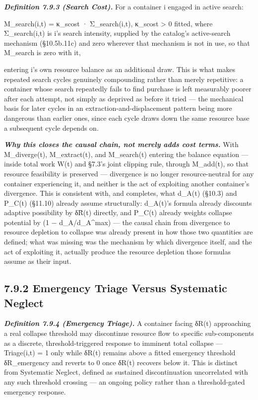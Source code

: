 \documentclass[
]{article}
\begin{document}
\emph{\textbf{Definition 7.9.3 (Search Cost).}} For a container i
engaged in active search:

M\_search(i,t) = κ\_scost · Σ\_search(i,t), κ\_scost \textgreater{} 0
fitted, where Σ\_search(i,t) is i's search intensity, supplied by the
catalog's active-search mechanism (§10.5b.11c) and zero wherever that
mechanism is not in use, so that M\_search is zero with it,

entering i's own resource balance as an additional draw. This is what
makes repeated search cycles genuinely compounding rather than merely
repetitive: a container whose search repeatedly fails to find purchase
is left measurably poorer after each attempt, not simply as deprived as
before it tried --- the mechanical basis for later cycles in an
extraction-and-displacement pattern being more dangerous than earlier
ones, since each cycle draws down the same resource base a subsequent
cycle depends on.

\emph{\textbf{Why this closes the causal chain, not merely adds cost
terms.}} With M\_diverge(t), M\_extract(t), and M\_search(t) entering
the balance equation --- inside total work W(t) and §7.3's joint
clipping rule, through M\_add(t), so that resource feasibility is
preserved --- divergence is no longer resource-neutral for any container
experiencing it, and neither is the act of exploiting another
container's divergence. This is consistent with, and completes, what
d\_A(t) (§10.3) and P\_C(t) (§11.10) already assume structurally:
d\_A(t)'s formula already discounts adaptive possibility by δR̃(t)
directly, and P\_C(t) already weights collapse potential by (1 −
d\_A/d\_A\^{}max) --- the causal chain from divergence to resource
depletion to collapse was already present in how those two quantities
are defined; what was missing was the mechanism by which divergence
itself, and the act of exploiting it, actually produce the resource
depletion those formulas assume as their input.

\hypertarget{emergency-triage-versus-systematic-neglect}{%
\subsection{7.9.2 Emergency Triage Versus Systematic
Neglect}\label{emergency-triage-versus-systematic-neglect}}

\emph{\textbf{Definition 7.9.4 (Emergency Triage).}} A container facing
δR(t) approaching a real collapse threshold may discontinue resource
flow to specific sub-components as a discrete, threshold-triggered
response to imminent total collapse --- Triage(i,t) = 1 only while δR(t)
remains above a fitted emergency threshold δR\_emergency and reverts to
0 once δR(t) recovers below it. This is distinct from Systematic
Neglect, defined as sustained discontinuation uncorrelated with any such
threshold crossing --- an ongoing policy rather than a threshold-gated
emergency response.
\end{document}
